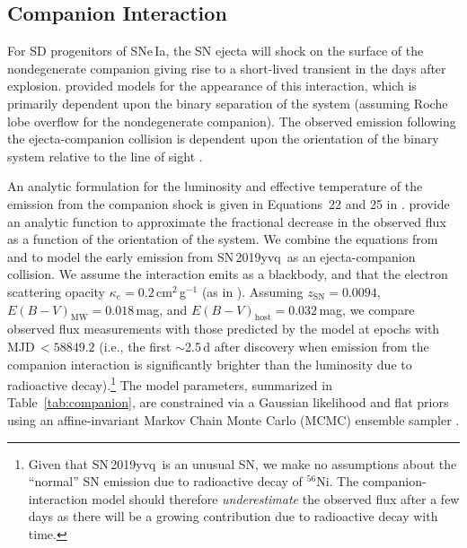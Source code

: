 \documentclass[twocolumn]{aastex63}
\newcommand{\radni}{$^{56}$Ni}
\newcommand{\sn}{SN\,2019yvq}
\begin{document}
\subsection{Companion Interaction}\label{sec:companion_interaction}

For SD progenitors of SNe\,Ia, the SN ejecta will shock on the surface of the
nondegenerate companion giving rise to a short-lived transient in the days
after explosion. \citet{Kasen10a} provided models for the appearance of this
interaction, which is primarily dependent upon the binary separation of the
system (assuming Roche lobe overflow for the nondegenerate companion). The
observed emission following the ejecta-companion collision is dependent upon
the orientation of the binary system relative to the line of sight
\citep{Kasen10a}.

An analytic formulation for the luminosity and effective temperature of the
emission from the companion shock is given in Equations~22 and 25 in
\citet{Kasen10a}. \citet{Brown12} provide an analytic function to approximate
the fractional decrease in the observed flux as a function of the orientation
of the system. We combine the equations from \citet{Kasen10a} and
\citet{Brown12} to model the early emission from \sn\ as an ejecta-companion
collision. We assume the interaction emits as a blackbody, and that the
electron scattering opacity $\kappa_e = 0.2$\,cm$^{2}$\,g$^{-1}$ (as in
\citealt{Kasen10a}). Assuming $z_\mathrm{SN} = 0.0094$, $E(B-V)_\mathrm{MW} =
0.018$\,mag, and $E(B-V)_\mathrm{host} = 0.032$\,mag, we compare observed flux
measurements with those predicted by the \citet{Kasen10a} model at epochs with
MJD$\,< 58849.2$ (i.e., the first $\sim$2.5\,d after discovery when emission
from the companion interaction is significantly brighter than the luminosity
due to radioactive decay).\footnote{Given that \sn\ is an unusual SN, we make
no assumptions about the ``normal'' SN emission due to radioactive decay of
\radni. The companion-interaction model should therefore
\textit{underestimate} the observed flux after a few days as there will be a
growing contribution due to radioactive decay with time.} The model
parameters, summarized in Table~\ref{tab:companion}, are constrained via a
Gaussian likelihood and flat priors using an affine-invariant
\citep{Goodman10} Markov Chain Monte Carlo (MCMC) ensemble sampler
\citep{Foreman-Mackey13}.


\end{document}
